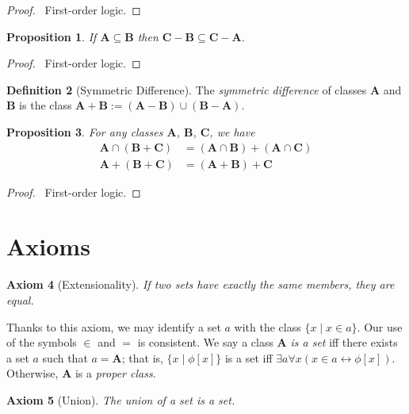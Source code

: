 \documentclass{book}
\let\qed\relax
\newtheorem{ax}{Axiom}[section]
\newtheorem{prop}[ax]{Proposition}
\theoremstyle{definition}
\newtheorem{df}[ax]{Definition}
\begin{document}
\begin{proof}
\pf\ First-order logic. \qed
\end{proof}

\begin{prop}
If $\mathbf{A} \subseteq \mathbf{B}$ then $\mathbf{C} - \mathbf{B} \subseteq \mathbf{C} - \mathbf{A}$.
\end{prop}

\begin{proof}
\pf\ First-order logic. \qed
\end{proof}

\begin{df}[Symmetric Difference]
The \emph{symmetric difference} of classes $\mathbf{A}$ and $\mathbf{B}$ is the class $\mathbf{A} + \mathbf{B} := (\mathbf{A} - \mathbf{B}) \cup (\mathbf{B} - \mathbf{A})$.
\end{df}

\begin{prop}
For any classes $\mathbf{A}$, $\mathbf{B}$, $\mathbf{C}$, we have
\begin{align*}
\mathbf{A} \cap (\mathbf{B} + \mathbf{C}) & = (\mathbf{A} \cap \mathbf{B}) + (\mathbf{A} \cap \mathbf{C}) \\
\mathbf{A} + (\mathbf{B} + \mathbf{C}) & = (\mathbf{A} + \mathbf{B}) + \mathbf{C}
\end{align*}
\end{prop}

\begin{proof}
\pf\ First-order logic. \qed
\end{proof}

\section{Axioms}
	
\begin{ax}[Extensionality]
If two sets have exactly the same members, they are equal.
\end{ax}

Thanks to this axiom, we may identify a set $a$ with the class $\{x \mid x \in a\}$. Our use of the symbols $\in$ and $=$ is consistent. We say a class $\mathbf{A}$ \emph{is a set} iff there exists a set $a$ such that $a = \mathbf{A}$; that is, $\{x \mid \phi[x]\}$ is a set iff $\exists a \forall x (x \in a \leftrightarrow \phi[x])$. Otherwise, $\mathbf{A}$ is a \emph{proper class}.

\begin{ax}[Union]
The union of a set is a set.
\end{ax}
\end{document}
